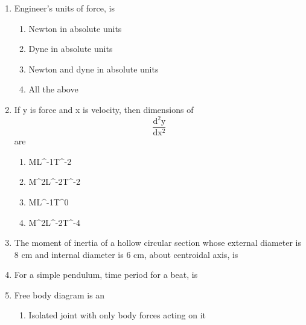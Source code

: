 \documentclass[11pt,a4paper]{article}
\begin{document}
\begin{enumerate}
\item{Engineer's units of force, is}
\begin{enumerate}[label=\Alph*.]
\item{Newton in absolute units}
\item{Dyne in absolute units}
\item{Newton and dyne in absolute units}
\item{All the above}
\end{enumerate}
\item{If y is force and x is velocity, then dimensions of $$\frac{{{{\text{d}}^2}{\text{y}}}}{{{\text{d}}{{\text{x}}^2}}}$$ are}
\begin{enumerate}[label=\Alph*.]
\item{ML\^{}-1T\^{}-2}
\item{M\^{}2L\^{}-2T\^{}-2}
\item{ML\^{}-1T\^{}0}
\item{M\^{}2L\^{}-2T\^{}-4}
\end{enumerate}
\item{The moment of inertia of a hollow circular section whose external diameter is 8 cm and internal diameter is 6 cm, about centroidal axis, is}
\\
\item{For a simple pendulum, time period for a beat, is}
\\
\item{Free body diagram is an}
\begin{enumerate}[label=\Alph*.]
\item{Isolated joint with only body forces acting on it}

\end{enumerate}
\end{enumerate}
\end{document}
